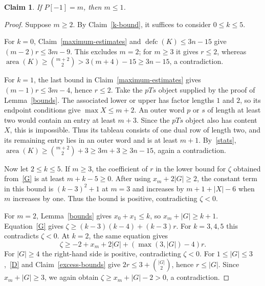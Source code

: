\documentclass[11pt]{article}
\DeclareMathOperator{\area}{area}\DeclareMathOperator{\dinv}{dinv}
\DeclareMathOperator{\defc}{defc}\DeclareMathOperator{\sym}{sym}
\newtheorem{claim}{Claim}
\begin{document}
\begin{claim}\label{maximum-height}
If $P[-1]=m$, then $m\le1$.
\end{claim}
\begin{proof}
Suppose $m\ge2$. By Claim~\ref{k-bound}, it suffices to consider $0\le k\le5$.

For $k=0$, Claim~\ref{maximum-estimates} and $\defc(K)\le3n-15$ give $(m-2)r\le3m-9$. This excludes $m=2$; for $m\ge3$ it gives $r\le2$, whereas $\area(K)\ge\binom{m+2}2>3(m+4)-15\ge3n-15$, a contradiction.

For $k=1$, the last bound in Claim~\ref{maximum-estimates} gives $(m-1)r\le3m-4$, hence $r\le2$. Take the $pTs$ object supplied by the proof of Lemma~\ref{bounds}. The associated lower or upper has factor lengths $1$ and $2$, so its endpoint conditions give $\max X\le m+2$. An outer word $p$ or $s$ of length at least two would contain an entry at least $m+3$. Since the $pTs$ object also has content $X$, this is impossible. Thus its tableau consists of one dual row of length two, and its remaining entry lies in an outer word and is at least $m+1$. By~\eqref{stats}, $\area(K)\ge\binom{m+2}2+3\ge3m+3\ge3n-15$, again a contradiction.

Now let $2\le k\le5$. If $m\ge3$, the coefficient of $r$ in the lower bound for $\zeta$ obtained from~\eqref{G} is at least $m+k-5\ge0$. After using $x_m+2|G|\ge2$, the constant term in this bound is $(k-3)^2+1$ at $m=3$ and increases by $m+1+|X|-6$ when $m$ increases by one. Thus the bound is positive, contradicting $\zeta<0$.

For $m=2$, Lemma~\ref{bounds} gives $x_0+x_1\le k$, so $x_m+|G|\ge k+1$. Equation~\eqref{G} gives $\zeta\ge(k-3)(k-4)+(k-3)r$. For $k=3,4,5$ this contradicts $\zeta<0$. At $k=2$, the same equation gives
\[
 \zeta\ge-2+x_m+2|G|+(\max(3,|G|)-4)r.
\]
For $|G|\ge4$ the right-hand side is positive, contradicting $\zeta<0$. For $1\le |G|\le3$,~\eqref{D} and Claim~\ref{excess-bounds} give $2r\le3+\binom{|G|}{2}$, hence $r\le |G|$. Since $x_m+|G|\ge3$, we again obtain $\zeta\ge x_m+|G|-2>0$, a contradiction.
\end{proof}
\end{document}
